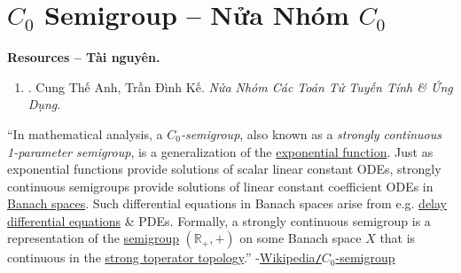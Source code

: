 \documentclass{article}
\begin{document}

\section{$C_0$ Semigroup -- Nửa Nhóm $C_0$}
\textbf{\textsf{Resources -- Tài nguyên.}}
\begin{enumerate}
	\item \cite{Anh_Ke_semigroup}. {\sc Cung Thế Anh, Trần Đình Kế}. {\it Nửa Nhóm Các Toán Tử Tuyến Tính \& Ứng Dụng}.
\end{enumerate}
``In mathematical analysis, a {\it $C_0$-semigroup}, also known as a {\it strongly continuous 1-parameter semigroup}, is a generalization of the \href{https://en.wikipedia.org/wiki/Exponential_function}{exponential function}. Just as exponential functions provide solutions of scalar linear constant ODEs, strongly continuous semigroups provide solutions of linear constant coefficient ODEs in \href{https://en.wikipedia.org/wiki/Banach_space}{Banach spaces}. Such differential equations in Banach spaces arise from e.g. \href{https://en.wikipedia.org/wiki/Delay_differential_equation}{delay differential equations} \& PDEs. Formally, a strongly continuous semigroup is a representation of the \href{https://en.wikipedia.org/wiki/Semigroup}{semigroup} $(\mathbb{R}_+,+)$ on some Banach space $X$ that is continuous in the \href{https://en.wikipedia.org/wiki/Strong_operator_topology}{strong toperator topology}.'' -\href{https://en.wikipedia.org/wiki/C0-semigroup}{Wikipedia{\tt/}$C_0$-semigroup}

\end{document}
